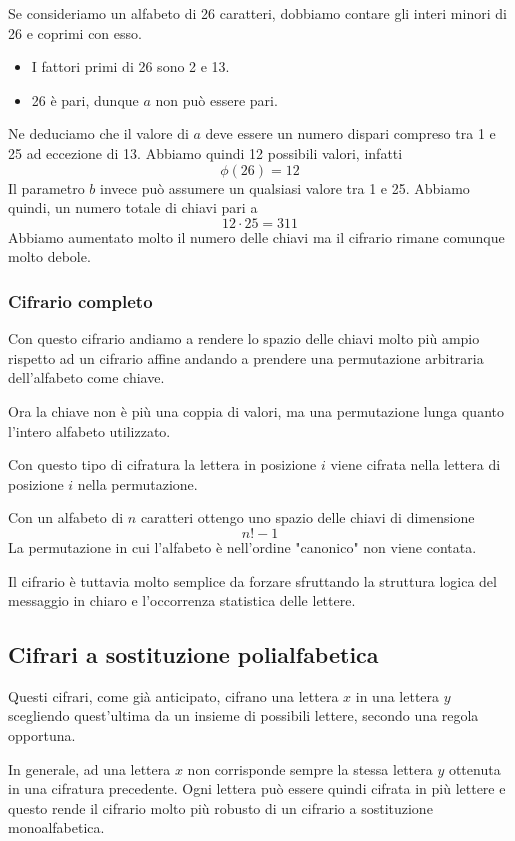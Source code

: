 Se consideriamo un alfabeto di 26 caratteri, dobbiamo contare gli interi minori di 26 e coprimi con esso.
\begin{itemize}
	\item I fattori primi di 26 sono 2 e 13.
	\item 26 \`e pari, dunque $a$ non pu\`o essere pari.
\end{itemize}
Ne deduciamo che il valore di $a$ deve essere un numero dispari compreso tra 1 e 25 ad eccezione di 13. Abbiamo quindi
12 possibili valori, infatti
\[ \phi(26) = 12 \]
Il parametro $b$ invece pu\`o assumere un qualsiasi valore tra 1 e 25. Abbiamo quindi, un numero totale di chiavi pari a
\[ 12 \cdot 25 = 311 \]
Abbiamo aumentato molto il numero delle chiavi ma il cifrario rimane comunque molto debole.

\subsubsection{Cifrario completo}
Con questo cifrario andiamo a rendere lo spazio delle chiavi molto pi\`u ampio rispetto ad un cifrario affine andando a
prendere una permutazione arbitraria dell'alfabeto come chiave.

Ora la chiave non \`e pi\`u una coppia di valori, ma una permutazione lunga quanto l'intero alfabeto utilizzato.

Con questo tipo di cifratura la lettera in posizione $i$ viene cifrata nella lettera di posizione $i$ nella permutazione.

Con un alfabeto di $n$ caratteri ottengo uno spazio delle chiavi di dimensione
\[ n! - 1 \]
La permutazione in cui l'alfabeto \`e nell'ordine "canonico" non viene contata.

Il cifrario \`e tuttavia molto semplice da forzare sfruttando la struttura logica del messaggio in chiaro e l'occorrenza
statistica delle lettere.

\subsection{Cifrari a sostituzione polialfabetica}
Questi cifrari, come gi\`a anticipato, cifrano una lettera $x$ in una lettera $y$ scegliendo quest'ultima da un insieme
di possibili lettere, secondo una regola opportuna.

In generale, ad una lettera $x$ non corrisponde sempre la stessa lettera $y$ ottenuta in una cifratura precedente. Ogni
lettera pu\`o essere quindi cifrata in pi\`u lettere e questo rende il cifrario molto pi\`u robusto di un cifrario
a sostituzione monoalfabetica.

